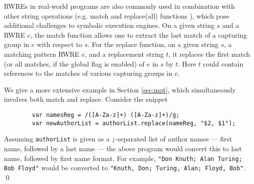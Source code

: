 RWREs in real-world programs are also commonly used in combination with
other string operations (e.g. match and replace(all) functions \cite{LMK19}),
which pose additional challenges to symbolic execution engines.
On a given string $s$ and a RWRE $e$, the match function allows one to extract 
the last match of a capturing group in $e$ with respect to $s$. 
For the replace function, on a given string $s$, a matching pattern RWRE $e$, and a replacement string $t$, it replaces the first match (or all 
matches, if the global flag is enabled) of $e$ in $s$ by $t$. Here $t$
could contain references to the matches of various capturing groups
in $e$. 
\begin{example}\label{exmp-name-swap}
    We give a more extensive example in Section \ref{sec:mot}, which 
    simultaneously involves both match and replace. Consider the snippet
    \begin{verbatim}
        var namesReg = /([A-Za-z]+) ([A-Za-z]+)/g;
        var newAuthorList = authorList.replace(nameReg, "$2, $1");
    \end{verbatim}
    Assuming \texttt{authorList} is given as a \texttt{;}-separated 
    list of author names --- first name, followed by a last name ---
    the above program would convert this to last name, followed by first name
    format. For example, \texttt{"Don Knuth; Alan Turing; Bob Floyd"} would
    be converted to \texttt{"Knuth, Don; Turing, Alan; Floyd, Bob"}.
    \qed
\end{example}


